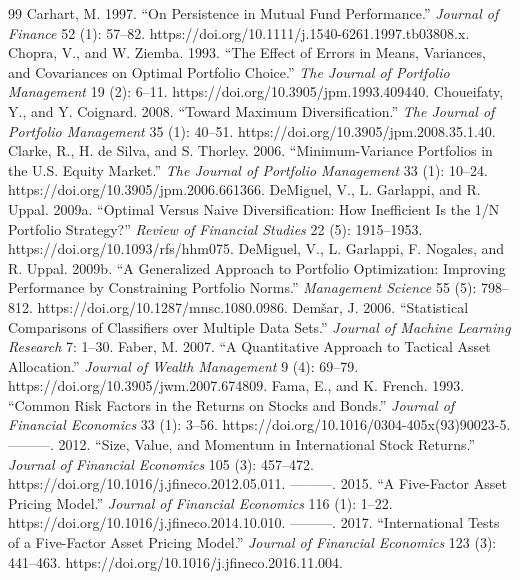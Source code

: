 \documentclass[12pt,letterpaper]{article}
\newcommand{\nuevo}[1]{{\color{nuevoc}#1}}
\begin{document}
\begin{thebibliography}{99}
 \nuevo{Carhart, M. 1997. ``On Persistence in Mutual Fund Performance.'' \emph{Journal of Finance} 52 (1): 57–82. https://doi.org/10.1111/j.1540-6261.1997.tb03808.x.}
 Chopra, V., and W. Ziemba. 1993. ``The Effect of Errors in Means, Variances, and Covariances on Optimal Portfolio Choice.'' \emph{The Journal of Portfolio Management} 19 (2): 6–11. https://doi.org/10.3905/jpm.1993.409440.
 Choueifaty, Y., and Y. Coignard. 2008. ``Toward Maximum Diversification.'' \emph{The Journal of Portfolio Management} 35 (1): 40–51. https://doi.org/10.3905/jpm.2008.35.1.40.
 Clarke, R., H. de Silva, and S. Thorley. 2006. ``Minimum-Variance Portfolios in the U.S. Equity Market.'' \emph{The Journal of Portfolio Management} 33 (1): 10–24. https://doi.org/10.3905/jpm.2006.661366.
 DeMiguel, V., L. Garlappi, and R. Uppal. 2009a. ``Optimal Versus Naive Diversification: How Inefficient Is the 1/N Portfolio Strategy?'' \emph{Review of Financial Studies} 22 (5): 1915–1953. https://doi.org/10.1093/rfs/hhm075.
 DeMiguel, V., L. Garlappi, F. Nogales, and R. Uppal. 2009b. ``A Generalized Approach to Portfolio Optimization: Improving Performance by Constraining Portfolio Norms.'' \emph{Management Science} 55 (5): 798–812. https://doi.org/10.1287/mnsc.1080.0986.
 Dem\v{s}ar, J. 2006. ``Statistical Comparisons of Classifiers over Multiple Data Sets.'' \emph{Journal of Machine Learning Research} 7: 1--30.
 Faber, M. 2007. ``A Quantitative Approach to Tactical Asset Allocation.'' \emph{Journal of Wealth Management} 9 (4): 69–79. https://doi.org/10.3905/jwm.2007.674809.
 Fama, E., and K. French. 1993. ``Common Risk Factors in the Returns on Stocks and Bonds.'' \emph{Journal of Financial Economics} 33 (1): 3–56. https://doi.org/10.1016/0304-405x(93)90023-5.
 \nuevo{---------. 2012. ``Size, Value, and Momentum in International Stock Returns.'' \emph{Journal of Financial Economics} 105 (3): 457–472. https://doi.org/10.1016/j.jfineco.2012.05.011.}
 \nuevo{---------. 2015. ``A Five-Factor Asset Pricing Model.'' \emph{Journal of Financial Economics} 116 (1): 1–22. https://doi.org/10.1016/j.jfineco.2014.10.010.}
 \nuevo{---------. 2017. ``International Tests of a Five-Factor Asset Pricing Model.'' \emph{Journal of Financial Economics} 123 (3): 441–463. https://doi.org/10.1016/j.jfineco.2016.11.004.}

\end{thebibliography}
\end{document}
